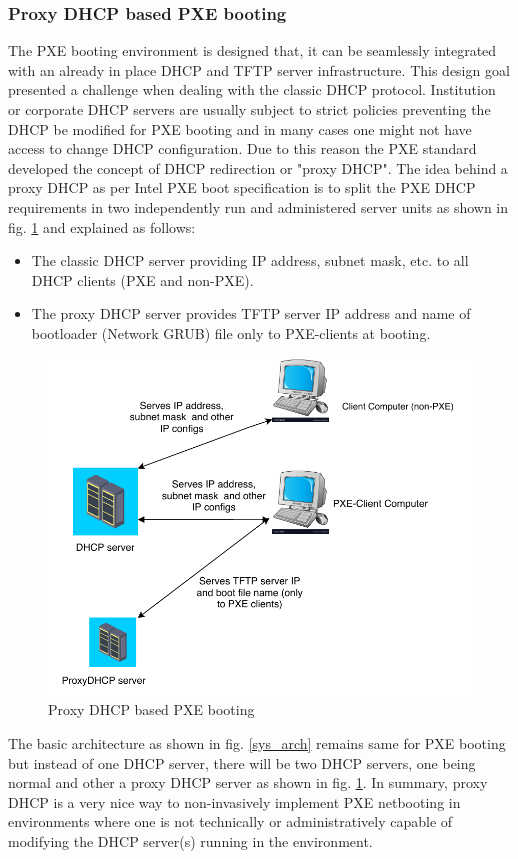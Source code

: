 \documentclass[a4paper,12pt]{article}
\begin{document}
\subsubsection{ Proxy DHCP based PXE booting}
The PXE booting environment is designed that, it can be seamlessly integrated with an already in place DHCP and TFTP server infrastructure. This design goal presented a challenge when dealing with the classic DHCP protocol. Institution or corporate DHCP servers are usually subject to strict policies preventing the DHCP be modified for PXE booting and in many cases one might not have access to change DHCP configuration. Due to this reason the PXE standard developed the concept of DHCP redirection or "proxy DHCP". The idea behind a proxy DHCP as per Intel PXE boot specification \cite{pxe_intel} is to split the PXE DHCP requirements in two independently run and administered server units as shown in fig. \ref{proxydhcp} and explained as follows:
\begin{itemize}
    \item The classic DHCP server providing IP address, subnet mask, etc. to all DHCP clients (PXE and non-PXE).
    \item The proxy DHCP server provides TFTP server IP address and name of bootloader (Network GRUB) file only to PXE-clients at booting.
\end{itemize}
\begin{figure}
    \centering
    \includegraphics[width=0.85\linewidth]{proxydhcp.pdf}
    \caption{Proxy DHCP based PXE booting}
    \label{proxydhcp}
\end{figure}

The basic architecture as shown in fig. \ref{sys_arch} remains same for PXE booting but instead of one DHCP server, there will be two DHCP servers, one being normal and other a proxy DHCP server as shown in fig. \ref{proxydhcp}. In summary, proxy DHCP is a very nice way to non-invasively implement PXE netbooting in environments where one is not technically or administratively capable of modifying the DHCP server(s) running in the environment.
    
\end{document}

